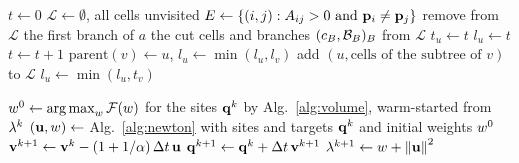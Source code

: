 \documentclass[main.tex]{subfiles}
\begin{document}
\begin{algorithm}[H]
  \caption{Cut cells and branches of the dual graph (\S\ref{sec:flow-dynamics}).}
  \label{alg:cut-cells}
  \begin{algorithmic}[1]
    \Require {}
    \State $t \gets 0$
    \State $\mathcal{L} \gets \emptyset$, all cells unvisited
    \State $E \gets \{(i,j) : A_{ij} > 0 \text{ and } \mathbf{p}_i \neq \mathbf{p}_j\}$ 
     
      \State {}
      \State remove from $\mathcal{L}$ the first branch of $a$ 
    \EndFor
    \State \Return the cut cells and branches $(c_B, \mathcal{B}_B)_B$ from $\mathcal{L}$
    \Statex
     
      \State $t_u \gets t$
      \State $l_u \gets t$
      \State $t \gets t + 1$
          \State $\mathrm{parent}(v) \gets u$, 
          \State {}
          \State $l_u \gets \min(l_u, l_v)$
           
            \State add $(u, \text{cells of the subtree of } v)$ to $\mathcal{L}$
          \EndIf
          \State $l_u \gets \min(l_u, t_v)$
        \EndIf
      \EndFor
    \EndFunction
  \end{algorithmic}
\end{algorithm}

\begin{algorithm}[H]
  \caption{Time step of the penalty-based integrator (\S\ref{sec:flow-penalty}).}
  \label{alg:flow-penalty}
  \begin{algorithmic}[1]
    \Require {}
    \State $w^0 \gets \operatorname{arg\,max}_{w} \mathcal{F}(w)$ for the sites $\mathbf{q}^k$ \Comment{\eqref{eq:volume-dual}}
    \Statex \hspace{\algorithmicindent} by Alg.~\ref{alg:volume}, warm-started from $\lambda^k$
    \State $(\mathbf{u}, w) \gets$ Alg.~\ref{alg:newton} with sites and targets $\mathbf{q}^k$
    \Statex \hspace{\algorithmicindent} and initial weights $w^0$
    \State $\mathbf{v}^{k+1} \gets \mathbf{v}^k - (1 + 1/\alpha)\,\Delta t\,\mathbf{u}$ \Comment{\eqref{eq:flow-softened-step-vel}}
    \State $\mathbf{q}^{k+1} \gets \mathbf{q}^k + \Delta t\,\mathbf{v}^{k+1}$ \Comment{\eqref{eq:flow-softened-step-pos}}
    \State $\lambda^{k+1} \gets w + \left\lVert \mathbf{u} \right\rVert^2$ \Comment{\eqref{eq:shifted-site-weight}}
    \State \Return {}
  \end{algorithmic}
\end{algorithm}
\end{document}
